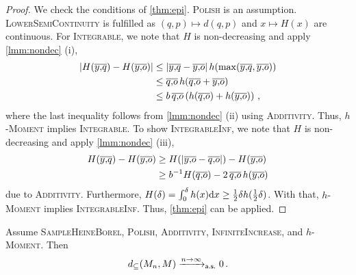\begin{proof}
	We check the conditions of \autoref{thm:epi}. \textsc{Polish} is an assumption. 
	\textsc{LowerSemiContinuity} is fulfilled as $(q,p)\mapsto d(q,p)$ and $x \mapsto H(x)$ are continuous.
	For \textsc{Integrable}, we note that $H$ is non-decreasing and apply \autoref{lmm:nondec} (i),
	\begin{align*}
		\abs{H(\ol yq) - H(\ol yo)} 
		&\leq 
		\abs{\ol yq - \ol yo} h\brOf{\max(\ol yq, \ol yo)}
		\\&\leq 
		\ol qo\, h(\ol qo + \ol yo)
		\\&\leq 
		b\, \ol qo \br{h(\ol qo) + h(\ol yo)}
		\eqcm
	\end{align*}
	where the last inequality follows from \autoref{lmm:nondec} (ii) using \textsc{Additivity}.
	Thus, \textsc{$h$-Moment} implies \textsc{Integrable}.
	To show \textsc{IntegrableInf}, we note that $H$ is non-decreasing and apply \autoref{lmm:nondec} (iii),
	\begin{align*}
		H(\ol yq) - H(\ol yo)
		&\geq 
		H(\abs{\ol yo - \ol qo}) - H(\ol yo)
		\\&\geq 
		b^{-1} H( \ol qo) - 2  \,\ol qo\, h( \ol yo)
	\end{align*}
	due to \textsc{Additivity}. Furthermore, $H(\delta)  = \int_0^\delta h(x) \mathrm{d} x \geq \frac12 \delta h(\frac12 \delta)$.
	With that, \textsc{$h$-Moment} implies \textsc{IntegrableInf}. 
	Thus, \autoref{thm:epi} can be applied.
\end{proof}
%
\begin{corollary}\label{cor:nondec:onehaus}
	Assume \textsc{SampleHeineBorel}, \textsc{Polish}, \textsc{Additivity}, \textsc{InfiniteIncrease}, and \textsc{$h$-Moment}.
	Then
	\begin{equation*}
		d_\subseteq(M_n, M) \xrightarrow{n\to\infty}_{\mathsf{a.s.}} 0
		\, .
	\end{equation*}
\end{corollary}
%
